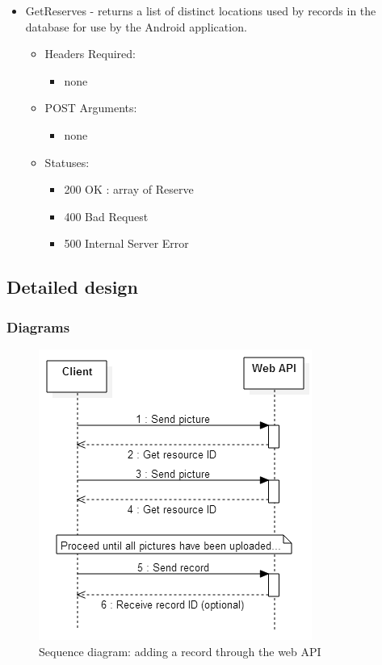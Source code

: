 \begin{itemize}
        \item GetReserves - returns a list of distinct locations used by records in the database for use by the Android application.
        \begin{itemize}
        \item Headers Required:
        \begin{itemize}
              	\item none
        \end{itemize}
        \item POST Arguments:
        \begin{itemize}
              	\item none
        \end{itemize}
        \item Statuses: 
        \begin{itemize}
              	\item 200 OK : array of Reserve
              	\item 400 Bad Request
              	\item 500 Internal Server Error
        \end{itemize}
	    \end{itemize}
    \end{itemize}

\subsection{Detailed design}
    \subsubsection{Diagrams}
        \begin{figure}
            \centering
            \includegraphics[scale=0.75]{server/working/SequenceDiagram-AddRecord.png}
            \caption{Sequence diagram: adding a record through the web API}
            \label{fig:addRecordSequenceDiagram}
        \end{figure}

